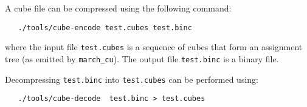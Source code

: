 \documentclass{llncs}
\begin{document}
A cube file can be compressed using the following command:
%
\begin{verbatim}
   ./tools/cube-encode test.cubes test.binc
\end{verbatim}
%
where the input file {\tt test.cubes} is  a sequence of cubes that form an assignment tree (as emitted by {\tt march\_cu}). The output
file {\tt test.binc} is a binary file.

Decompressing {\tt  test.binc} into {\tt test.cubes} can be performed using:

\begin{verbatim}
   ./tools/cube-decode  test.binc > test.cubes
\end{verbatim}

%



\end{document}
